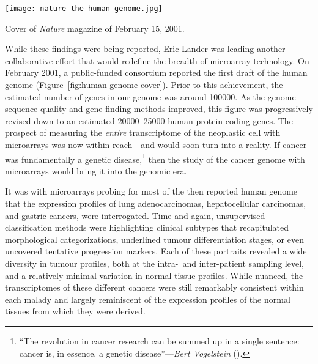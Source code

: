 
\begin{marginfigure}%
  \texttt{[image: nature-the-human-genome.jpg]}
  \caption{Cover of \emph{Nature} magazine of February 15, 2001.}
  \label{fig:human-genome-cover}
\end{marginfigure}

While these findings were being reported, Eric Lander was leading another
collaborative effort that would redefine the breadth of microarray technology.
On February 2001, a \mbox{public-funded} consortium reported the first draft of
the human genome (Figure~\ref{fig:human-genome-cover}).  Prior to this
achievement, the estimated number of genes in our genome was around
\num{100000}.\cite{cox_assessing_1994} As the genome sequence quality and gene
finding methods improved, this figure was progressively revised down to an
estimated \num{20000}--\num{25000} human protein coding genes.  The prospect of
measuring the \emph{entire} transcriptome of the neoplastic cell with
microarrays was now within reach---and would soon turn into a reality.  If
cancer was fundamentally a genetic disease,\footnote{``The revolution in cancer
  research can be summed up in a single sentence: cancer is, in essence, a
  genetic disease''---\emph{Bert Vogelstein}
  (\citealp{vogelstein_cancer_2004}).} then the study of the cancer genome with
microarrays would bring it into the genomic era.

It was with microarrays probing for most of the then reported human genome that
the expression profiles of lung adenocarcinomas\cite{garber_diversity_2001},
hepatocellular carcinomas,\cite{chen_gene_2002} and gastric
cancers,\cite{leung_phospholipase_2002} were interrogated.  Time and again,
unsupervised classification methods were highlighting clinical subtypes that
recapitulated morphological categorizations, underlined tumour differentiation
stages, or even uncovered tentative progression markers.  Each of these
portraits revealed a wide diversity in tumour profiles, both at the \mbox{intra-
  and} \mbox{inter-patient} sampling level, and a relatively minimal variation
in normal tissue profiles.  While nuanced, the transcriptomes of these different
cancers were still remarkably consistent within each malady and largely
reminiscent of the expression profiles of the normal tissues from which they
were derived.\cite{botstein_genomic_2003}

